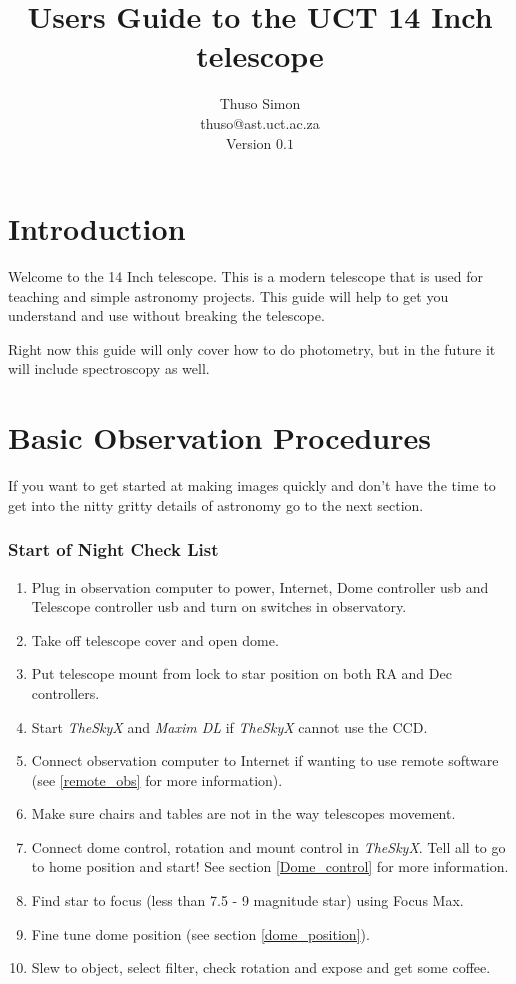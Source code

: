 \documentclass[12pt,twoside,a4paper]{report}
\title{Users Guide to the UCT 14 Inch telescope}
\author{Thuso Simon \\
	thuso@ast.uct.ac.za \\
	Version $0.1$}
\begin{document}
\maketitle
\tableofcontents

\chapter{Introduction}
Welcome to the 14 Inch telescope. This is a modern telescope that is used for teaching and simple astronomy projects. This guide will help to get you understand and use without breaking the telescope.

Right now this guide will only cover how to do photometry, but in the future it will include spectroscopy as well.
\chapter{Basic Observation Procedures}
If you want to get started at making images quickly and don't have the time to get into the nitty gritty details of astronomy go to the next section.

\subsection{Start of Night Check List}
\begin{enumerate}
 \item Plug in observation computer to power, Internet, Dome controller usb and Telescope controller usb and turn on switches in observatory.
 \item Take off telescope cover and open dome.
 \item Put telescope mount from lock to star position on both RA and Dec controllers.
 \item Start \emph{TheSkyX} and \emph{Maxim DL} if \emph{TheSkyX} cannot use the CCD.
 \item Connect observation computer to Internet if wanting to use remote software (see \ref{remote_obs} for more information). 
 \item Make sure chairs and tables are not in the way telescopes movement.
 \item Connect dome control, rotation and mount control in \emph{TheSkyX}. Tell all to go to home position and start! See section \ref{Dome_control} for more information.
 \item Find star to focus (less than 7.5 - 9 magnitude star) using Focus Max.
 \item Fine tune dome position (see section \ref{dome_position}).
 \item Slew to object, select filter, check rotation and expose and get some coffee.
 
\end{enumerate}
\end{document}
